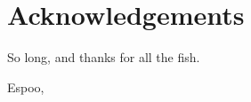 \chapter*{Acknowledgements}

So long, and thanks for all the fish.

\vskip 10mm

\noindent Espoo, \DATE
\vskip 5mm
\noindent\AUTHOR